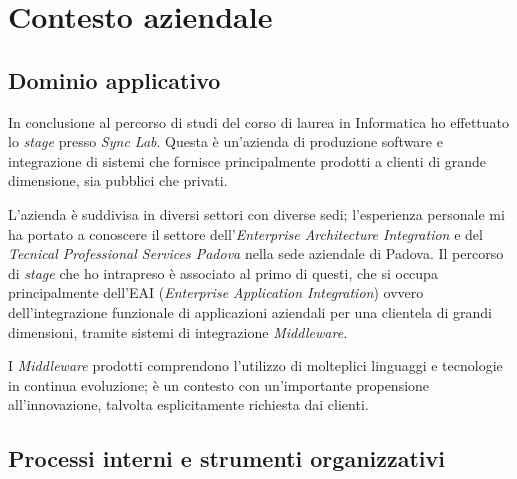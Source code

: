 \chapter{Contesto aziendale}

\section{Dominio applicativo}
In conclusione al percorso di studi del corso di laurea in Informatica ho effettuato lo \textit{stage} presso \textit{Sync Lab}.
Questa è un'azienda di produzione software e integrazione di sistemi che fornisce principalmente prodotti a clienti di grande dimensione, sia pubblici che privati.

L'azienda è suddivisa in diversi settori con diverse sedi; l'esperienza personale mi ha portato a conoscere il settore dell'\textit{Enterprise Architecture Integration} e del \textit{Tecnical Professional Services Padova} nella sede aziendale di Padova.
Il percorso di \textit{stage} che ho intrapreso è associato al primo di questi, che si occupa principalmente dell'EAI (\textit{Enterprise Application Integration}) ovvero dell'integrazione funzionale di applicazioni aziendali per una clientela di grandi dimensioni, tramite sistemi di integrazione \textit{Middleware}.

I \textit{Middleware} prodotti comprendono l'utilizzo di molteplici linguaggi e tecnologie in continua evoluzione; è un contesto con un'importante propensione all'innovazione, talvolta esplicitamente richiesta dai clienti.

\section{Processi interni e strumenti organizzativi}

%

